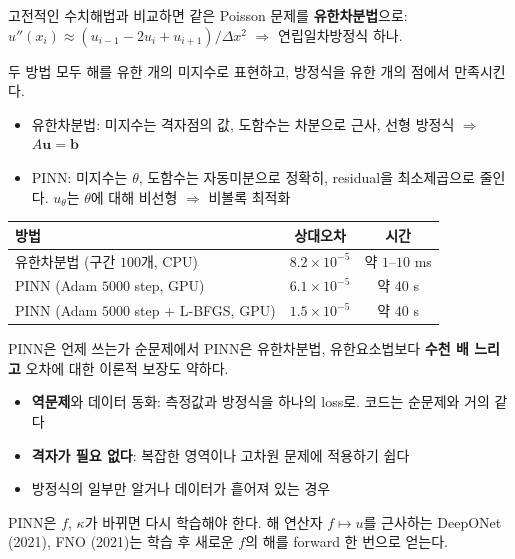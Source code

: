 \documentclass[aspectratio=169,11pt]{beamer}
\newcommand{\vect}[1]{\bm{#1}}
\begin{document}
\begin{frame}{고전적인 수치해법과 비교하면}
같은 Poisson 문제를 \textbf{유한차분법}으로: $u''(x_i)\approx(u_{i-1}-2u_i+u_{i+1})/\Delta x^2$ $\Rightarrow$ 연립일차방정식 하나.
\vskip1mm
\begin{remarkbox}
\small
두 방법 모두 해를 유한 개의 미지수로 표현하고, 방정식을 유한 개의 점에서 만족시킨다.
\begin{itemize}
\item 유한차분법: 미지수는 격자점의 값, 도함수는 차분으로 근사, 선형 방정식 $\Rightarrow$ $A\vect u=\vect b$
\item PINN: 미지수는 $\theta$, 도함수는 자동미분으로 정확히, residual을 최소제곱으로 줄인다. $u_\theta$는 $\theta$에 대해 비선형 $\Rightarrow$ 비볼록 최적화
\end{itemize}
\end{remarkbox}
\begin{center}
\small
\begin{tabular}{@{}lcc@{}}
\toprule
방법 & 상대오차 & 시간 \\
\midrule
유한차분법 (구간 $100$개, CPU) & $8.2\times10^{-5}$ & 약 $1$--$10$ ms \\
PINN (Adam $5000$ step, GPU) & $6.1\times10^{-5}$ & 약 $40$ s \\
PINN (Adam $5000$ step + L-BFGS, GPU) & $1.5\times10^{-5}$ & 약 $40$ s \\
\bottomrule
\end{tabular}
\end{center}
\end{frame}

\begin{frame}{PINN은 언제 쓰는가}
순문제에서 PINN은 유한차분법, 유한요소법보다 \textbf{수천 배 느리고} 오차에 대한 이론적 보장도 약하다.
\begin{keybox}
\begin{itemize}
\item \textbf{역문제}와 데이터 동화: 측정값과 방정식을 하나의 loss로. 코드는 순문제와 거의 같다
\item \textbf{격자가 필요 없다}: 복잡한 영역이나 고차원 문제에 적용하기 쉽다
\item 방정식의 일부만 알거나 데이터가 흩어져 있는 경우
\end{itemize}
\end{keybox}
\begin{remarkbox}
\footnotesize PINN은 $f$, $\kappa$가 바뀌면 다시 학습해야 한다. 해 연산자 $f\mapsto u$를 근사하는 DeepONet (2021), FNO (2021)는 학습 후 새로운 $f$의 해를 forward 한 번으로 얻는다.
\end{remarkbox}
\end{frame}
\end{document}
